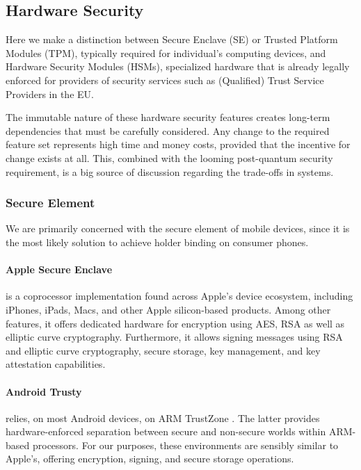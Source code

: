 
\subsection{Hardware Security}

Here we make a distinction between Secure Enclave (SE) or Trusted Platform Modules (TPM), typically required for individual's computing devices, and Hardware Security Modules (HSMs), specialized hardware that is already legally enforced for providers of security services such as (Qualified) Trust Service Providers in the EU.

The immutable nature of these hardware security features creates long-term dependencies that must be carefully considered. Any change to the required feature set represents high time and money costs, provided that the incentive for change exists at all. This, combined with the looming post-quantum security requirement, is a big source of discussion regarding the trade-offs in \eid systems.


\subsubsection{Secure Element} 

We are primarily concerned with the secure element of mobile devices, since it is the most likely solution to achieve holder binding on consumer phones.

\paragraph{Apple Secure Enclave} \cite{apple-secure-enclaves} is a coprocessor implementation found across Apple's device ecosystem, including iPhones, iPads, Macs, and other Apple silicon-based products. Among other features, it offers dedicated hardware for encryption using AES, RSA as well as elliptic curve cryptography.
Furthermore, it allows signing messages using RSA and elliptic curve cryptography, secure storage, key management, and key attestation capabilities.

\paragraph{Android Trusty} \cite{trusty} relies, on most Android devices, on ARM TrustZone \cite{arm-trustzone}. 
The latter provides hardware-enforced separation between secure and non-secure worlds within ARM-based processors.
For our purposes, these environments are sensibly similar to Apple's, offering encryption, signing, and secure storage operations.


